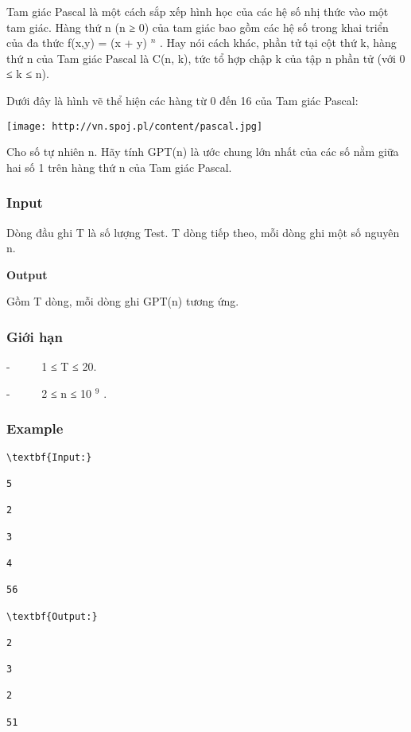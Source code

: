 



   Tam giác Pascal là một cách sắp xếp hình học của các hệ số nhị thức vào một tam giác. Hàng thứ n (n ≥ 0) của tam giác bao gồm các hệ số trong khai triển của đa thức f(x,y) = (x + y)   $^    n   $   . Hay nói cách khác, phần tử tại cột thứ k, hàng thứ n của Tam giác Pascal là C(n, k), tức tổ hợp chập k của tập n phần tử (với 0 ≤ k ≤ n).  

   Dưới đây là hình vẽ thể hiện các hàng từ 0 đến 16 của Tam giác Pascal:  


\texttt{[image: http://vn.spoj.pl/content/pascal.jpg]}



   Cho số tự nhiên n. Hãy tính GPT(n) là ước chung lớn nhất của các số nằm giữa hai số 1 trên hàng thứ n của Tam giác Pascal.  

\subsubsection{   Input  }

   Dòng đầu ghi T là số lượng Test. T dòng tiếp theo, mỗi dòng ghi một số nguyên n.  

\textbf{    Output   }

   Gồm T dòng, mỗi dòng ghi GPT(n) tương ứng.  

\subsubsection{\textbf{    Giới hạn   }}

   -       1 ≤ T ≤ 20.  

   -       2 ≤ n ≤ 10   $^    9   $   .  

\subsubsection{   Example  }
\begin{verbatim}
\textbf{Input:}

5

2

3

4

56

\textbf{Output:}

2

3

2

51\end{verbatim}